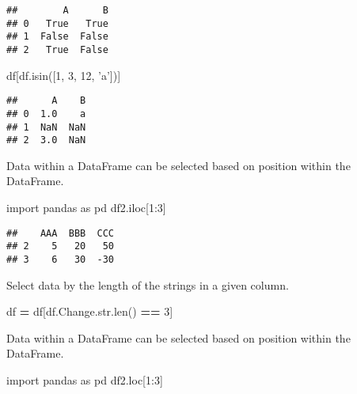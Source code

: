 \documentclass[]{book}
\newenvironment{Shaded}{\begin{snugshade}}{\end{snugshade}}
\newcommand{\DecValTok}[1]{\textcolor[rgb]{0.00,0.00,0.81}{#1}}
\newcommand{\StringTok}[1]{\textcolor[rgb]{0.31,0.60,0.02}{#1}}
\newcommand{\ImportTok}[1]{#1}
\newcommand{\OperatorTok}[1]{\textcolor[rgb]{0.81,0.36,0.00}{\textbf{#1}}}
\newcommand{\BuiltInTok}[1]{#1}
\newcommand{\NormalTok}[1]{#1}
\begin{document}
\begin{verbatim}
##        A      B
## 0   True   True
## 1  False  False
## 2   True  False
\end{verbatim}

\begin{Shaded}
\begin{Highlighting}[]
\NormalTok{df[df.isin([}\DecValTok{1}\NormalTok{, }\DecValTok{3}\NormalTok{, }\DecValTok{12}\NormalTok{, }\StringTok{'a'}\NormalTok{])]}
\end{Highlighting}
\end{Shaded}

\begin{verbatim}
##      A    B
## 0  1.0    a
## 1  NaN  NaN
## 2  3.0  NaN
\end{verbatim}

Data within a DataFrame can be selected based on position within the
DataFrame.

\begin{Shaded}
\begin{Highlighting}[]
\ImportTok{import}\NormalTok{ pandas }\ImportTok{as}\NormalTok{ pd}
\NormalTok{df2.iloc[}\DecValTok{1}\NormalTok{:}\DecValTok{3}\NormalTok{]}
\end{Highlighting}
\end{Shaded}

\begin{verbatim}
##    AAA  BBB  CCC
## 2    5   20   50
## 3    6   30  -30
\end{verbatim}

Select data by the length of the strings in a given column.

\begin{Shaded}
\begin{Highlighting}[]
\NormalTok{df }\OperatorTok{=}\NormalTok{ df[df.Change.}\BuiltInTok{str}\NormalTok{.}\BuiltInTok{len}\NormalTok{() }\OperatorTok{==} \DecValTok{3}\NormalTok{]}
\end{Highlighting}
\end{Shaded}

Data within a DataFrame can be selected based on position within the
DataFrame.

\begin{Shaded}
\begin{Highlighting}[]
\ImportTok{import}\NormalTok{ pandas }\ImportTok{as}\NormalTok{ pd}
\NormalTok{df2.loc[}\DecValTok{1}\NormalTok{:}\DecValTok{3}\NormalTok{]}
\end{Highlighting}
\end{Shaded}
\end{document}
